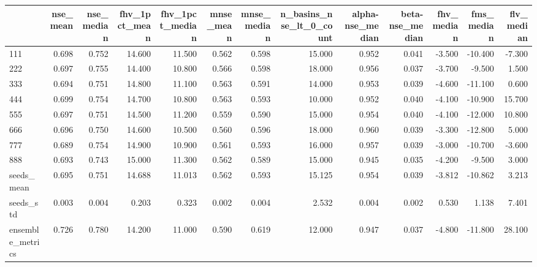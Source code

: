 \begin{tabular}{lrrrrrrrrrrrr}
\toprule
 & nse_mean & nse_median & fhv_1pct_mean & fhv_1pct_median & mnse_mean & mnse_median & n_basins_nse_lt_0_count & alpha-nse_median & beta-nse_median & fhv_median & fms_median & flv_median \\
\midrule
111 & 0.698 & 0.752 & 14.600 & 11.500 & 0.562 & 0.598 & 15.000 & 0.952 & 0.041 & -3.500 & -10.400 & -7.300 \\
222 & 0.697 & 0.755 & 14.400 & 10.800 & 0.566 & 0.598 & 18.000 & 0.956 & 0.037 & -3.700 & -9.500 & 1.500 \\
333 & 0.694 & 0.751 & 14.800 & 11.100 & 0.563 & 0.591 & 14.000 & 0.953 & 0.039 & -4.600 & -11.100 & 0.600 \\
444 & 0.699 & 0.754 & 14.700 & 10.800 & 0.563 & 0.593 & 10.000 & 0.952 & 0.040 & -4.100 & -10.900 & 15.700 \\
555 & 0.697 & 0.751 & 14.500 & 11.200 & 0.559 & 0.590 & 15.000 & 0.954 & 0.040 & -4.100 & -12.000 & 10.800 \\
666 & 0.696 & 0.750 & 14.600 & 10.500 & 0.560 & 0.596 & 18.000 & 0.960 & 0.039 & -3.300 & -12.800 & 5.000 \\
777 & 0.689 & 0.754 & 14.900 & 10.900 & 0.561 & 0.593 & 16.000 & 0.957 & 0.039 & -3.000 & -10.700 & -3.600 \\
888 & 0.693 & 0.743 & 15.000 & 11.300 & 0.562 & 0.589 & 15.000 & 0.945 & 0.035 & -4.200 & -9.500 & 3.000 \\
seeds_mean & 0.695 & 0.751 & 14.688 & 11.013 & 0.562 & 0.593 & 15.125 & 0.954 & 0.039 & -3.812 & -10.862 & 3.213 \\
seeds_std & 0.003 & 0.004 & 0.203 & 0.323 & 0.002 & 0.004 & 2.532 & 0.004 & 0.002 & 0.530 & 1.138 & 7.401 \\
ensemble_metrics & 0.726 & 0.780 & 14.200 & 11.000 & 0.590 & 0.619 & 12.000 & 0.947 & 0.037 & -4.800 & -11.800 & 28.100 \\
\bottomrule
\end{tabular}
